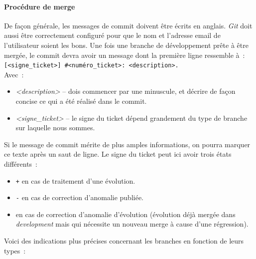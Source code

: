\paragraph{Procédure de merge}
De façon générale, les messages de commit doivent être écrits en anglais. \emph{Git} doit aussi être correctement configuré pour que le nom et l'adresse email de l'utilisateur soient les bons.
Une fois une branche de développement prête à être mergée, le commit devra avoir un message dont la première ligne ressemble à~:\\
{\tt[<signe\_ticket>] \#<numéro\_ticket>: <description>.}\\
Avec~:
\begin{itemize}
	\item\emph{<description>} -- dois commencer par une minuscule, et décrire de façon concise ce qui a été réalisé dans le commit.
	\item\emph{<signe\_ticket>} -- le signe du ticket dépend grandement du type de branche sur laquelle nous sommes.
\end{itemize}
Si le message de commit mérite de plus amples informations, on pourra marquer ce texte après un saut de ligne.
	Le signe du ticket peut ici avoir trois états différents~:
		\begin{itemize}
			\item {\tt+} en cas de traitement d'une évolution.
			\item {\tt-} en cas de correction d'anomalie publiée.
			\item {\tt*} en cas de correction d'anomalie d'évolution (évolution déjà mergée dans \emph{development} mais qui nécessite un nouveau merge à cause d'une régression).
		\end{itemize}
Voici des indications plus précises concernant les branches en fonction de leurs types~:
